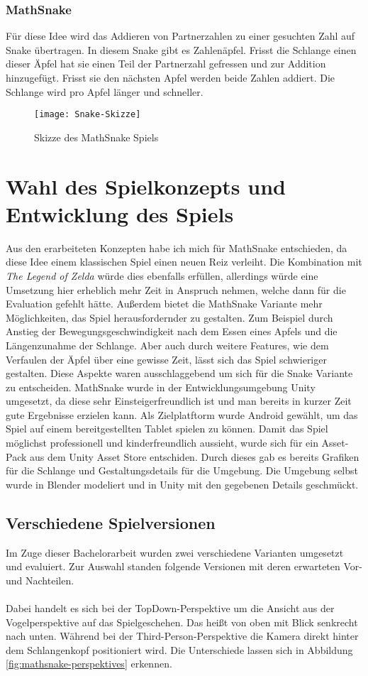 \subsubsection{MathSnake}
Für diese Idee wird das Addieren von Partnerzahlen zu einer gesuchten Zahl auf Snake übertragen. In diesem Snake gibt es Zahlenäpfel. Frisst die Schlange einen dieser Äpfel hat sie einen Teil der Partnerzahl gefressen und zur Addition hinzugefügt. Frisst sie den nächsten Apfel werden beide Zahlen addiert. Die Schlange wird pro Apfel länger und schneller.
\begin{figure}[htb]
	\centering
	\texttt{[image: Snake-Skizze]}
	\caption{Skizze des MathSnake Spiels\label{fig:mathsnake}}
\end{figure}
\section{Wahl des Spielkonzepts und Entwicklung des Spiels}
Aus den erarbeiteten Konzepten habe ich mich für MathSnake entschieden, da diese Idee einem klassischen Spiel einen neuen Reiz verleiht. Die Kombination mit \textit{The Legend of Zelda} würde dies ebenfalls erfüllen, allerdings würde eine Umsetzung hier erheblich mehr Zeit in Anspruch nehmen, welche dann für die Evaluation gefehlt hätte. Außerdem bietet die MathSnake Variante mehr Möglichkeiten, das Spiel herausfordernder zu gestalten. Zum Beispiel durch Anstieg der Bewegungsgeschwindigkeit nach dem Essen eines Apfels und die Längenzunahme der Schlange. Aber auch durch weitere Features, wie dem Verfaulen der Äpfel über eine gewisse Zeit, lässt sich das Spiel schwieriger gestalten. Diese Aspekte waren ausschlaggebend um sich für die Snake Variante zu entscheiden.
MathSnake wurde in der Entwicklungsumgebung Unity umgesetzt, da diese sehr Einsteigerfreundlich ist und man bereits in kurzer Zeit gute Ergebnisse erzielen kann. Als Zielplatftorm wurde Android gewählt, um das Spiel auf einem bereitgestellten Tablet spielen zu können. Damit das Spiel möglichst professionell und kinderfreundlich aussieht, wurde sich für ein Asset-Pack aus dem Unity Asset Store entschiden. Durch dieses gab es bereits Grafiken für die Schlange und Gestaltungsdetails für die Umgebung. Die Umgebung selbst wurde in Blender modeliert und in Unity mit den gegebenen Details geschmückt.
\subsection{Verschiedene Spielversionen}
Im Zuge dieser Bachelorarbeit wurden zwei verschiedene Varianten umgesetzt und evaluiert. Zur Auswahl standen folgende Versionen mit deren erwarteten Vor- und Nachteilen.\\
\\
Dabei handelt es sich bei der TopDown-Perspektive um die Ansicht aus der Vogelperspektive auf das Spielgeschehen. Das heißt von oben mit Blick senkrecht nach unten. Während bei der Third-Person-Perspektive die Kamera direkt hinter dem Schlangenkopf positioniert wird. Die Unterschiede lassen sich in Abbildung \ref{fig:mathsnake-perspektives} erkennen.

